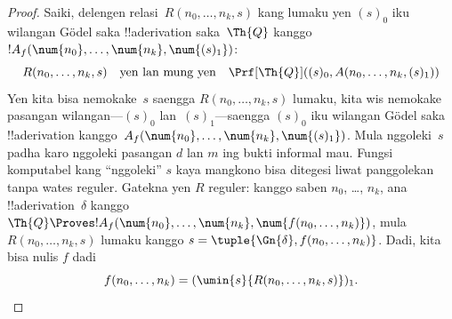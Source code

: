 \documentclass[../../../include/open-logic-section]{subfiles}
\begin{document}
\begin{proof}
Saiki, delengen relasi~$R(n_0, \dots, n_k, s)$ kang lumaku yen
$(s)_0$ iku wilangan G\"odel saka !!a{derivation} saka~$\Th{Q}$ kanggo
$!A_f(\num{n_0}, \dots, \num{n_k}, \num{(s)_1})$:
\[
R(n_0, \dots, n_k, s) \quad\text{yen lan mung yen}\quad \Prf[\Th{Q}]((s)_0, A(n_0,
\dots, n_k, (s)_1))
\]
Yen kita bisa nemokake~$s$ saengga $R(n_0, \dots, n_k, s)$ lumaku, kita wis
nemokake pasangan wilangan---$(s)_0$ lan~$(s)_1$---saengga $(s)_0$ iku
wilangan G\"odel saka !!a{derivation} kanggo~$A_f(\num{n_0}, \dots,
\num{n_k}, \num{(s)_1})$. Mula nggoleki~$s$ padha karo nggoleki pasangan
$d$ lan $m$ ing bukti informal mau. Fungsi komputabel kang
``nggoleki'' $s$ kaya mangkono bisa ditegesi liwat panggolekan tanpa
wates reguler. Gatekna yen $R$ reguler: kanggo saben $n_0$, \dots, $n_k$, ana
!!a{derivation}~$\delta$ kanggo $\Th{Q} \Proves !A_f(\num{n_0}, \dots,
\num{n_k}, \num{f(n_0, \dots, n_k)})$, mula $R(n_0, \dots, n_k, s)$
lumaku kanggo $s = \tuple{\Gn{\delta}, f(n_0, \dots, n_k)}$. Dadi, kita bisa
nulis $f$ dadi
\[
f(n_0,\dots,n_{k}) = (\umin{s}{R(n_0, \dots, n_k, s)})_1.
\]
\end{proof}
\end{document}
